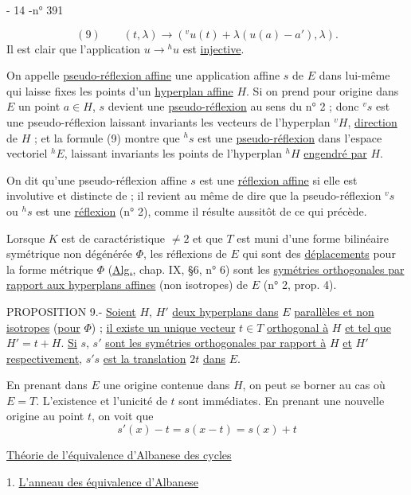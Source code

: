 - 14 -\hfill n° 391

\[
(9)\qquad(t,\lambda)\longrightarrow({}^vu(t)+\lambda(u(a)-a'),\lambda).
\]
Il est clair que l'application $u\longrightarrow{}^hu$ est \uline{injective}.

On appelle \uline{pseudo-réflexion affine} une application affine $s$ de $E$ dans lui-même qui laisse fixes les points d'un \uline{hyperplan affine} $H$. Si on prend pour origine dans $E$ un point $a\in H$, $s$ devient une \uline{pseudo-réflexion} au sens du n° 2 ; donc ${}^vs$ est une pseudo-réflexion laissant invariants les vecteurs de l'hyperplan ${}^vH$, \uline{direction} de $H$ ; et la formule (9) montre que ${}^hs$ est une \uline{pseudo-réflexion} dans l'espace vectoriel ${}^hE$, laissant invariants les points de l'hyperplan ${}^hH$ \uline{engendré par} $H$.

On dit qu'une pseudo-réflexion affine $s$ est une \uline{réflexion affine} si elle est involutive et distincte de  ; il revient au même de dire que la pseudo-réflexion ${}^vs$ ou ${}^hs$ est une \uline{réflexion} (n° 2), comme il résulte aussitôt de ce qui précède.

Lorsque $K$ est de caractéristique $\ne2$ et que $T$ est muni d'une forme bilinéaire symétrique non dégénérée $\Phi$, les réflexions de $E$ qui sont des \uline{déplacements} pour la forme métrique $\Phi$ (\uline{Alg.}, chap. IX, §6, n° 6) sont les \uline{symétries orthogonales par rapport aux hyperplans affines} (non isotropes) de $E$ (n° 2, prop. 4).

PROPOSITION 9.- \uline{Soient} $H$, $H'$ \uline{deux hyperplans dans} $E$ \uline{parallèles et non isotropes} (\uline{pour} $\Phi$) ; \uline{il existe un unique vecteur} $t\in T$ \uline{orthogonal à} $H$ \uline{et tel que} $H'=t+H$. \uline{Si} $s$, $s'$ \uline{sont les symétries orthogonales par rapport à} $H$ \uline{et} $H'$ \uline{respectivement}, $s's$ \uline{est la translation} $2t$ \uline{dans} $E$.

En prenant dans $E$ une origine contenue dans $H$, on peut se borner au cas où $E=T$. L'existence et l'unicité de $t$ sont immédiates. En prenant une nouvelle origine au point $t$, on voit que
\[
s'(x)-t=s(x-t)=s(x)+t
\]



\uline{Théorie de l'équivalence d'Albanese des cycles}

1. \uline{L'anneau des équivalence d'Albanese}

